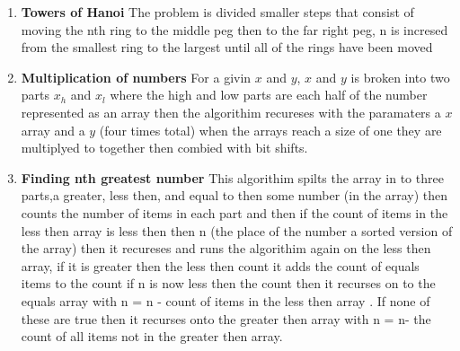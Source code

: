 \documentclass[11pt]{article}
\begin{document}
  \begin{enumerate}
		\item {\bf Towers of Hanoi}
		The problem is divided smaller steps that consist of moving the nth ring to the middle peg then
		to the far right peg, n is incresed from the smallest ring to the largest until all of the rings
		have been moved
		\item {\bf Multiplication of numbers}
		For a givin $x$ and $y$, $x$ and $y$  is broken into two parts $x_h$ and $x_l$ where the high 
		and low parts are each half of the number represented as an array then the algorithim recureses 
		with the paramaters a $x$ array and a $y$ (four times total) when the arrays reach a size of one
		they are multiplyed to together then combied with bit shifts.
		\item {\bf Finding nth greatest number}
		This algorithim spilts the array in to three parts,a greater, less then, and equal to
		then some number (in the array) then counts the number of items in each part
		and then if the count of items in the less then array is less then 
		then n (the place of the number a sorted version of the array) then it recureses and
		runs the algorithim again on the less then array, if it is greater then the less then
		count it adds the count of equals items to the count if n is now less then the count
		then it recurses on to the equals array with n = n - count of items in the less then array
		. If none of these are true then it recurses onto the greater then array with n = n- the 
		count of all items not in the greater then array.
	\end{enumerate}
		
	
	
\end{document}
